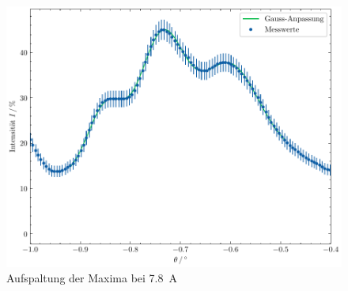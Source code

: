 \begin{figure}[h]
    \centering
    \begin{minipage}{0.45\linewidth}
        \centering
        \includegraphics[width=\linewidth]{../figs/gauss_i7.8.pdf}
        \caption{Aufspaltung der Maxima bei \SI{7.8}{\ampere}}
        \label{fig:gauss_i78}
    \end{minipage}

\end{figure}